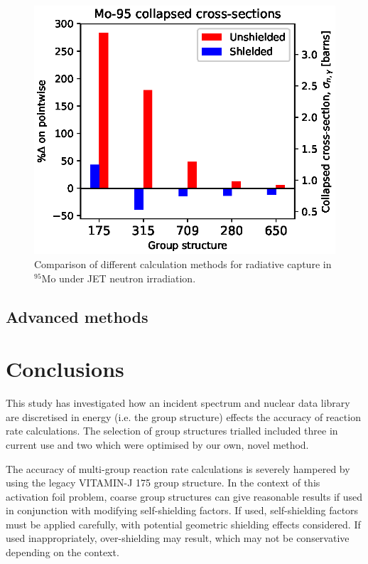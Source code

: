 \begin{figure}[H]
  \centering
  \includegraphics[width=\linewidth]{Mo-95.eps}
  \caption{Comparison of different calculation methods for radiative capture in $^{95}$Mo under JET neutron irradiation.}
  \label{fig:molybdenum-95}
\end{figure}

\subsection{Advanced methods}


\section{Conclusions}

This study has investigated how an incident spectrum and nuclear data library are discretised in energy (i.e. the group structure) effects the accuracy of reaction rate calculations. The selection of group structures trialled included three in current use and two which were optimised by our own, novel method.

The accuracy of multi-group reaction rate calculations is severely hampered by using the legacy VITAMIN-J 175 group structure. In the context of this activation foil problem, coarse group structures can give reasonable results if used in conjunction with modifying self-shielding factors. If used, self-shielding factors must be applied carefully, with potential geometric shielding effects considered. If used inappropriately, over-shielding may result, which may not be conservative depending on the context.

